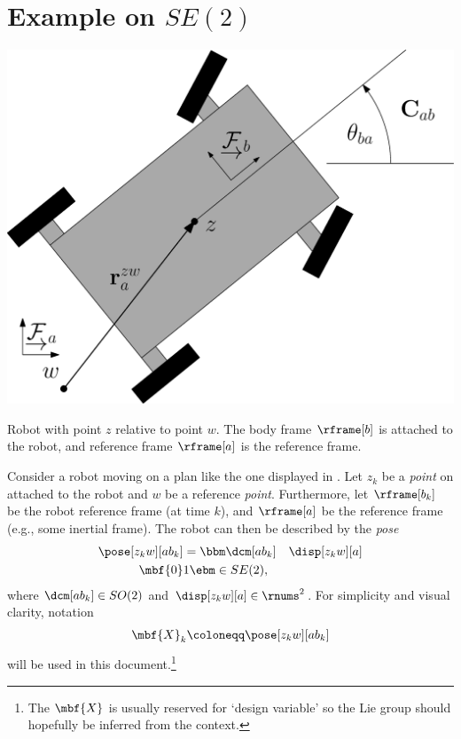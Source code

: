 \documentclass[ nobib, nofonts, notoc]{tufte-handout}
\begin{document}
    \section[Example on the planar Special Euclidean group]{Example on $SE(2)$}
    \begin{marginfigure}%
        \includegraphics[width=\linewidth]{figs/Graphics/car_body.eps}
        \caption{Robot with point $z$ relative to point $w$. The body frame $\rframe[b]$ is attached to the robot, and reference frame $\rframe[a]$ is the reference frame.}
        \label{fig:car body}
    \end{marginfigure}
    Consider a robot moving on a plan like the one displayed in .
    Let $z_{k}$ be a \emph{point} on attached to the robot and $w$ be a reference \emph{point}.
    Furthermore, let $\rframe[b_{k}]$ be the robot reference frame (at time $k$), and $\rframe[a]$ be the reference frame (e.g., some inertial frame).
    The robot can then be described by the \emph{pose}
    \begin{align}
        \pose[z_{k}w][ab_{k}] &=
        \bbm
            \dcm[ab_{k}] & \disp[z_{k}w][a] \\
            \mbf{0} & 1
        \ebm \in SE(2),
    \end{align}
    where $\dcm[ab_{k}]\in SO(2)$ and $\disp[z_{k}w][a]\in\rnums^{2}$.
    For simplicity and visual clarity, notation
    \begin{align}
        \mbf{X}_{k} \coloneqq \pose[z_{k}w][ab_{k}]
    \end{align}
    will be used in this document.\footnote{The $\mbf{X}$ is usually reserved for `design variable' so the Lie group should hopefully be inferred from the context.}
\end{document}
